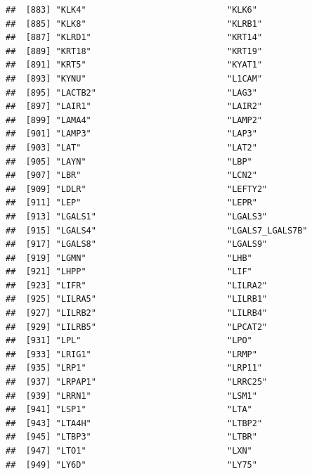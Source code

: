 \documentclass[
]{article}
\begin{document}
\begin{verbatim}
##  [883] "KLK4"                            "KLK6"                           
##  [885] "KLK8"                            "KLRB1"                          
##  [887] "KLRD1"                           "KRT14"                          
##  [889] "KRT18"                           "KRT19"                          
##  [891] "KRT5"                            "KYAT1"                          
##  [893] "KYNU"                            "L1CAM"                          
##  [895] "LACTB2"                          "LAG3"                           
##  [897] "LAIR1"                           "LAIR2"                          
##  [899] "LAMA4"                           "LAMP2"                          
##  [901] "LAMP3"                           "LAP3"                           
##  [903] "LAT"                             "LAT2"                           
##  [905] "LAYN"                            "LBP"                            
##  [907] "LBR"                             "LCN2"                           
##  [909] "LDLR"                            "LEFTY2"                         
##  [911] "LEP"                             "LEPR"                           
##  [913] "LGALS1"                          "LGALS3"                         
##  [915] "LGALS4"                          "LGALS7_LGALS7B"                 
##  [917] "LGALS8"                          "LGALS9"                         
##  [919] "LGMN"                            "LHB"                            
##  [921] "LHPP"                            "LIF"                            
##  [923] "LIFR"                            "LILRA2"                         
##  [925] "LILRA5"                          "LILRB1"                         
##  [927] "LILRB2"                          "LILRB4"                         
##  [929] "LILRB5"                          "LPCAT2"                         
##  [931] "LPL"                             "LPO"                            
##  [933] "LRIG1"                           "LRMP"                           
##  [935] "LRP1"                            "LRP11"                          
##  [937] "LRPAP1"                          "LRRC25"                         
##  [939] "LRRN1"                           "LSM1"                           
##  [941] "LSP1"                            "LTA"                            
##  [943] "LTA4H"                           "LTBP2"                          
##  [945] "LTBP3"                           "LTBR"                           
##  [947] "LTO1"                            "LXN"                            
##  [949] "LY6D"                            "LY75"                           

\end{verbatim}
\end{document}
